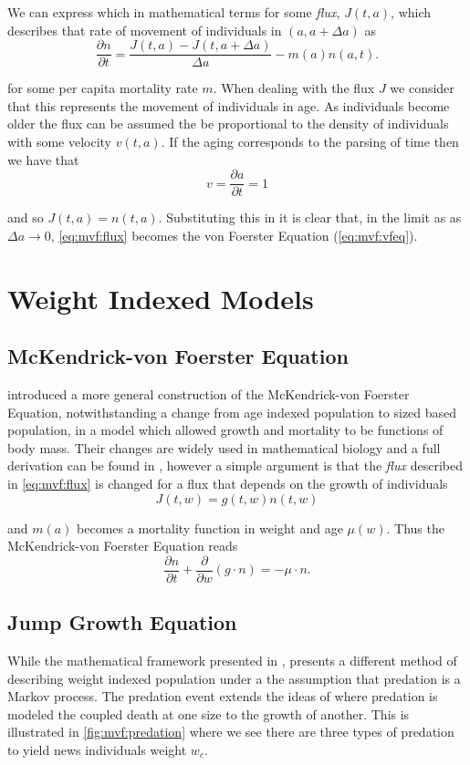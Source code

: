 \documentclass[../main.tex]{subfiles}
\begin{document}
  We can express which in mathematical terms for some \emph{flux}, $J(t, a)$, which describes that rate of movement of individuals in $(a, a + \Delta a)$ as
  \begin{equation}\label{eq:mvf:flux}
    \frac{\partial n}{\partial t} = \frac{J(t, a) - J(t, a + \Delta a)}{\Delta a} - m(a) n(a, t).
  \end{equation}

  for some per capita mortality rate $m$. When dealing with the flux $J$ we consider that this represents the movement of individuals in age. As individuals become older the flux can be assumed the be proportional to the density of individuals with some velocity $v(t, a)$. If the aging corresponds to the parsing of time then we have that
  $$ v = \frac{\partial a}{\partial t} = 1$$

  and so $J(t, a) = n(t, a)$. Substituting this in it is clear that, in the limit as as $\Delta a \to 0$, \autoref{eq:mvf:flux} becomes the von Foerster Equation (\autoref{eq:mvf:vfeq}).

  \section{Weight Indexed Models}
  \subsection{McKendrick-von Foerster Equation}
  \cite{silvert1978} introduced a more general construction of the McKendrick-von Foerster Equation, notwithstanding a change from age indexed population to sized based population, in a model which allowed growth and mortality to be functions of body mass. Their changes are widely used in mathematical biology and a full derivation can be found in \cite{silvert1978}, however a simple argument is that the \emph{flux} described in \autoref{eq:mvf:flux} is changed for a flux that depends on the growth of individuals
  $$J(t, w) = g(t, w)n(t, w)$$

  and $m(a)$ becomes a mortality function in weight and age $\mu(w)$. Thus the McKendrick-von Foerster Equation reads
  \begin{equation}\label{eq:mvf:mvf}
    \frac{\partial n}{\partial t} + \frac{\partial}{\partial w} \left(g \cdot n \right) = - \mu \cdot n.
  \end{equation}

  \subsection{Jump Growth Equation}
  While the mathematical framework presented in \cite{silvert1978}, \cite{datta2010} presents a different method of describing weight indexed population under a the assumption that predation is a Markov process. The predation event extends the ideas of \cite{silvert1980} where predation is modeled the coupled death at one size to the growth of another. This is illustrated in \autoref{fig:mvf:predation} where we see there are three types of predation to yield news individuals weight $w_c$.
\end{document}
